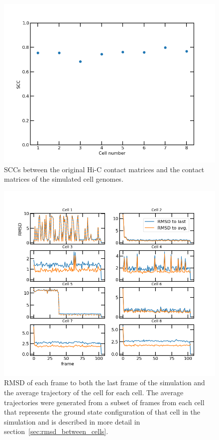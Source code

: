 \documentclass[a4paper,11pt,oneside,final,english,toc=bib,draft]{scrbook}
\newcommand{\figwidth}{11.5cm} %
\begin{document}
\begin{figure}[ht]
\centering
  \includegraphics[width=\figwidth]{hic_vs_sim_scc.png}
  \caption{SCCs between the original Hi-C contact matrices and the contact matrices of the simulated cell genomes.}
  \label{fig:hic_vs_sim_scc}
\end{figure}

\begin{figure}[ht]
\centering
  \includegraphics[width=\textwidth+0.5cm]{rmsd_last_vs_avg.png}
  \caption{RMSD of each frame to both the last frame of the simulation and the average trajectory of the cell for each cell. The average trajectories were generated from a subset of frames from each cell that represents the ground state configuration of that cell in the simulation and is described in more detail in section~\ref{sec:rmsd_between_cells}.}
  \label{fig:rmsd_last_vs_avg}
\end{figure}
\end{document}
